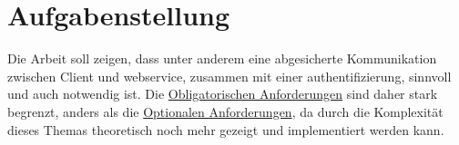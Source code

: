 \chapter{Aufgabenstellung}\label{ch:aufgabenstellung}

	Die Arbeit soll zeigen,
	dass unter anderem eine abgesicherte Kommunikation
	zwischen Client und \gls{webservice},
	zusammen mit einer \gls{authentifizierung},
	sinnvoll und auch notwendig ist.
	Die \hyperref[sec:obligatorische-anforderungen]{Obligatorischen Anforderungen}
	sind daher stark begrenzt,
	anders als die \hyperref[sec:optionale-anforderungen]{Optionalen Anforderungen},
	da durch die Komplexität dieses Themas theoretisch noch mehr gezeigt und implementiert werden kann.

	
	
